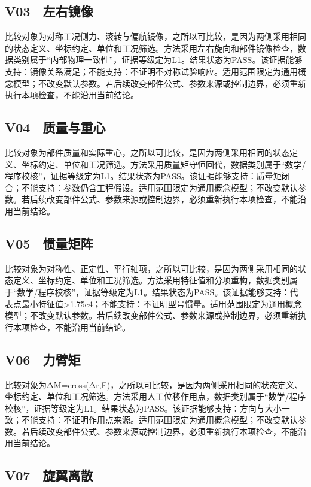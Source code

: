 \documentclass[UTF8,12pt,openany]{ctexbook}
\begin{document}
\subsection{V03　左右镜像}

比较对象为对称工况侧力、滚转与偏航镜像，之所以可比较，是因为两侧采用相同的状态定义、坐标约定、单位和工况筛选。方法采用左右旋向和部件镜像检查，数据类别属于“内部物理一致性”，证据等级定为L1。结果状态为PASS。该证据能够支持：镜像关系满足；不能支持：不证明不对称试验响应。适用范围限定为通用概念模型；不改变默认参数。若后续改变部件公式、参数来源或控制边界，必须重新执行本项检查，不能沿用当前结论。

\subsection{V04　质量与重心}

比较对象为部件质量和实际重心，之所以可比较，是因为两侧采用相同的状态定义、坐标约定、单位和工况筛选。方法采用质量矩守恒回代，数据类别属于“数学/程序校核”，证据等级定为L1。结果状态为PASS。该证据能够支持：质量矩闭合；不能支持：参数仍含工程假设。适用范围限定为通用概念模型；不改变默认参数。若后续改变部件公式、参数来源或控制边界，必须重新执行本项检查，不能沿用当前结论。

\subsection{V05　惯量矩阵}

比较对象为对称性、正定性、平行轴项，之所以可比较，是因为两侧采用相同的状态定义、坐标约定、单位和工况筛选。方法采用特征值和分项重构，数据类别属于“数学/程序校核”，证据等级定为L1。结果状态为PASS。该证据能够支持：代表点最小特征值>1.75e4；不能支持：不证明型号惯量。适用范围限定为通用概念模型；不改变默认参数。若后续改变部件公式、参数来源或控制边界，必须重新执行本项检查，不能沿用当前结论。

\subsection{V06　力臂矩}

比较对象为ΔM=cross(Δr,F)，之所以可比较，是因为两侧采用相同的状态定义、坐标约定、单位和工况筛选。方法采用人工位移作用点，数据类别属于“数学/程序校核”，证据等级定为L1。结果状态为PASS。该证据能够支持：方向与大小一致；不能支持：不证明作用点来源。适用范围限定为通用概念模型；不改变默认参数。若后续改变部件公式、参数来源或控制边界，必须重新执行本项检查，不能沿用当前结论。

\subsection{V07　旋翼离散}
\end{document}
